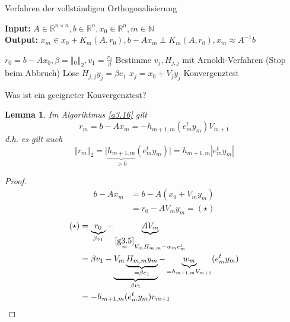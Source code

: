 \documentclass{book}
\newtheorem{lemma}[algorithm]{Lemma}
\def\R{\mathbb{R}}
\def\N{\mathbb{N}}
\begin{document}
            \begin{algorithm}[H]\label{a3.16}
                \caption{Verfahren der vollständigen Orthogonalisierung}
                \textbf{Input:} $A\in\R^{n\times n},b\in\R^n,x_0\in\R^n,m\in\N$\\
                \textbf{Output:} $x_m\in x_0+K_m(A,r_0),b-Ax_m\perp K_m(A,r_0), x_m\approx A^{-1}b$
                \begin{algorithmic}
                \State $r_0=b-Ax_0,\beta=\left\Vert _0 \right\Vert_2,v_1=\frac{r_0}{\beta}$
                    \State Bestimme $v_j, H_{j,j}$ mit Arnoldi-Verfahren (Stop beim Abbruch)
                    \State Löse $H_{j,j}y_j = \beta e_1$
                    \State $x_j=x_0+V_jy_j$
                    \State Konvergenztest
                \EndFor
                \end{algorithmic}
            \end{algorithm}

            Was ist ein geeigneter Konvergenztest?

            \begin{lemma}\label{l3.17}
                Im Algorihtmus \ref{a3.16} gilt 
                \[r_m=b-Ax_m=-h_{m+1,m}(e_m^ty_m)V_{m+1}\]
                d.h. es gilt auch 
                \[
                    \left\Vert r_m \right\Vert_2 = \vert \underbrace{h_{m+1,m}}_{>0} (e^t_m y_m)\vert = h_{m+1,m} \left\vert e_m^ty_m \right\vert    
                \]
            \end{lemma}

            \begin{proof}
                \begin{align*}
                    b-Ax_m&=b-A(x_0+V_my_m)\\
                    &= r_0-  AV_my_m = (\star)
                \end{align*}
                \begin{align*}
                    (\star)&= \underbrace{r_0}_{\beta v_1}-\underbrace{AV_m}_{\stackrel{\ref{g3.5}}{=}V_mH_{m,m}-w_me_m^t}\\
                     &= \beta v_1 - \underbrace{V_m\underbrace{H_{m,m}y_m}_{=\beta e_1}}_{\beta v_1}- \underbrace{w_m}_{=h_{m+1,m}V_{m+1}}(e_m^ty_m)\\
                     &= -h_{m+1,m}(e_m^ty_m)v_{m+1}
                \end{align*}
            \end{proof}
\end{document}
